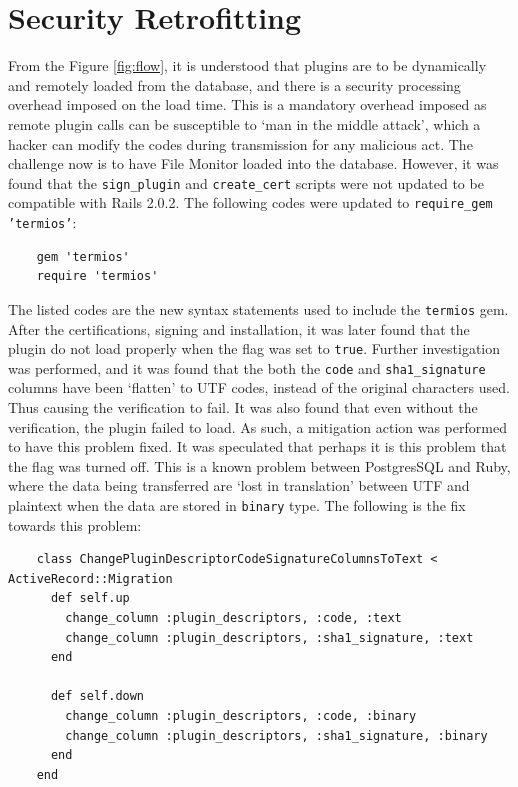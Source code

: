 \documentclass{article}
\begin{document}

\section{Security Retrofitting} %
\label{sec:security_retrofitting}

From the Figure \ref{fig:flow}, it is understood that plugins are to be dynamically and remotely loaded from the database, and there is a security processing overhead imposed on the load time. This is a mandatory overhead imposed as remote plugin calls can be susceptible to `man in the middle attack', which a hacker can modify the codes during transmission for any malicious act. The challenge now is to have File Monitor loaded into the database. However, it was found that the \texttt{sign\_plugin} and \texttt{create\_cert} scripts were not updated to be compatible with Rails 2.0.2. The following codes were updated to \texttt{require\_gem 'termios'}: 

\begin{verbatim}
    gem 'termios'
    require 'termios'
\end{verbatim}

The listed codes are the new syntax statements used to include the \texttt{termios} gem. After the certifications, signing and installation, it was later found that the plugin do not load properly when the flag was set to \texttt{true}. Further investigation was performed, and it was found that the both the \texttt{code} and \texttt{sha1\_signature} columns have been `flatten' to UTF codes, instead of the original characters used. Thus causing the verification to fail. It was also found that even without the verification, the plugin failed to load. As such, a mitigation action was performed to have this problem fixed. It was speculated that perhaps it is this problem that the flag was turned off. This is a known problem between PostgresSQL and Ruby, where the data being transferred are `lost in translation' between UTF and plaintext when the data are stored in \texttt{binary} type. The following is the fix towards this problem:

\begin{verbatim}
    class ChangePluginDescriptorCodeSignatureColumnsToText < ActiveRecord::Migration
      def self.up
        change_column :plugin_descriptors, :code, :text
        change_column :plugin_descriptors, :sha1_signature, :text
      end

      def self.down
        change_column :plugin_descriptors, :code, :binary
        change_column :plugin_descriptors, :sha1_signature, :binary
      end
    end
\end{verbatim}
\end{document}
